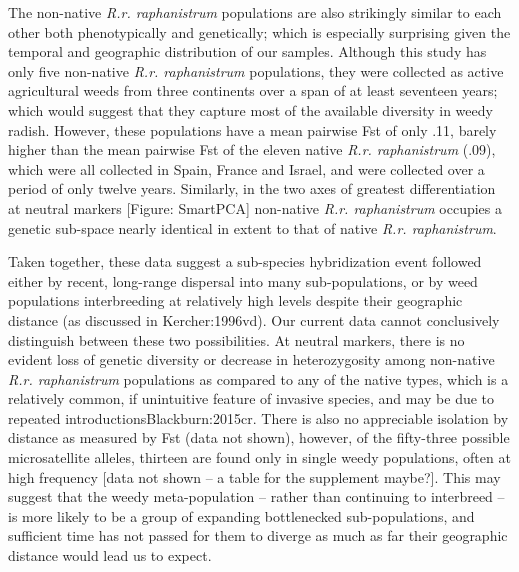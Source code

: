 \documentclass[twocolumn]{bmcart}%
\begin{document}
The non-native \textit{R.r. raphanistrum} populations are also strikingly similar to each other both phenotypically and genetically; which is especially surprising given the temporal and geographic distribution of our samples. Although this study has only five non-native \textit{R.r. raphanistrum} populations, they were collected as active agricultural weeds from three continents over a span of at least seventeen years; which would suggest that they capture most of the available diversity in weedy radish. However, these populations have a mean pairwise Fst of only .11, barely higher than the mean pairwise Fst of the eleven native \textit{R.r. raphanistrum} (.09), which were all collected in Spain, France and Israel, and were collected over a period of only twelve years. Similarly, in the two axes of greatest differentiation at neutral markers [Figure: SmartPCA] non-native \textit{R.r. raphanistrum} occupies a genetic sub-space nearly identical in extent to that of native \textit{R.r. raphanistrum}. 

Taken together, these data suggest a sub-species hybridization event followed either by recent, long-range dispersal into many sub-populations, or by weed populations interbreeding at relatively high levels despite their geographic distance (as discussed in {Kercher:1996vd}). Our current data cannot conclusively distinguish between these two possibilities. At neutral markers, there is no evident loss of genetic diversity or decrease in heterozygosity among non-native \textit{R.r. raphanistrum} populations as compared to any of the native types, which is a relatively common, if unintuitive feature of invasive species, and may be due to repeated introductions{Blackburn:2015cr}. There is also no appreciable isolation by distance as measured by Fst (data not shown), however, of the fifty-three possible microsatellite alleles, thirteen are found only in single weedy populations, often at high frequency [data not shown – a table for the supplement maybe?]. This may suggest that the weedy meta-population – rather than continuing to interbreed – is more likely to be a group of expanding bottlenecked sub-populations, and sufficient time has not passed for them to diverge as much as far their geographic distance would lead us to expect. 
\end{document}
